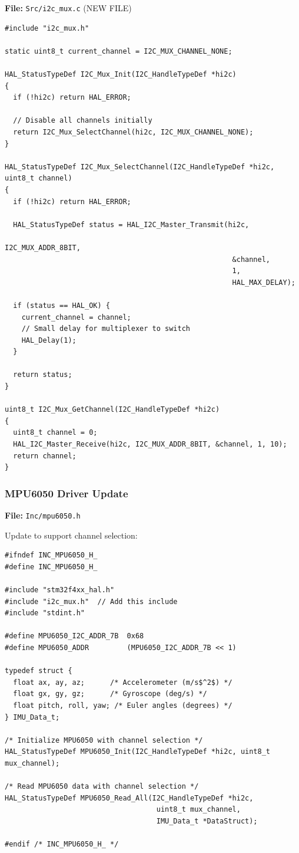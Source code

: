 \documentclass[11pt,a4paper]{article}
\begin{document}
\textbf{File:} \texttt{Src/i2c\_mux.c} (NEW FILE)

\begin{lstlisting}[caption=I2C Multiplexer Implementation, label=lst:i2cmuxc]
#include "i2c_mux.h"

static uint8_t current_channel = I2C_MUX_CHANNEL_NONE;

HAL_StatusTypeDef I2C_Mux_Init(I2C_HandleTypeDef *hi2c)
{
  if (!hi2c) return HAL_ERROR;
  
  // Disable all channels initially
  return I2C_Mux_SelectChannel(hi2c, I2C_MUX_CHANNEL_NONE);
}

HAL_StatusTypeDef I2C_Mux_SelectChannel(I2C_HandleTypeDef *hi2c, uint8_t channel)
{
  if (!hi2c) return HAL_ERROR;
  
  HAL_StatusTypeDef status = HAL_I2C_Master_Transmit(hi2c, 
                                                      I2C_MUX_ADDR_8BIT,
                                                      &channel, 
                                                      1, 
                                                      HAL_MAX_DELAY);
  
  if (status == HAL_OK) {
    current_channel = channel;
    // Small delay for multiplexer to switch
    HAL_Delay(1);
  }
  
  return status;
}

uint8_t I2C_Mux_GetChannel(I2C_HandleTypeDef *hi2c)
{
  uint8_t channel = 0;
  HAL_I2C_Master_Receive(hi2c, I2C_MUX_ADDR_8BIT, &channel, 1, 10);
  return channel;
}
\end{lstlisting}

\subsubsection{MPU6050 Driver Update}

\textbf{File:} \texttt{Inc/mpu6050.h}

Update to support channel selection:

\begin{lstlisting}[caption=Updated MPU6050 Header, label=lst:mpu6050updated]
#ifndef INC_MPU6050_H_
#define INC_MPU6050_H_

#include "stm32f4xx_hal.h"
#include "i2c_mux.h"  // Add this include
#include "stdint.h"

#define MPU6050_I2C_ADDR_7B  0x68
#define MPU6050_ADDR         (MPU6050_I2C_ADDR_7B << 1)

typedef struct {
  float ax, ay, az;      /* Accelerometer (m/s$^2$) */
  float gx, gy, gz;      /* Gyroscope (deg/s) */
  float pitch, roll, yaw; /* Euler angles (degrees) */
} IMU_Data_t;

/* Initialize MPU6050 with channel selection */
HAL_StatusTypeDef MPU6050_Init(I2C_HandleTypeDef *hi2c, uint8_t mux_channel);

/* Read MPU6050 data with channel selection */
HAL_StatusTypeDef MPU6050_Read_All(I2C_HandleTypeDef *hi2c, 
                                    uint8_t mux_channel,
                                    IMU_Data_t *DataStruct);

#endif /* INC_MPU6050_H_ */
\end{lstlisting}
\end{document}
